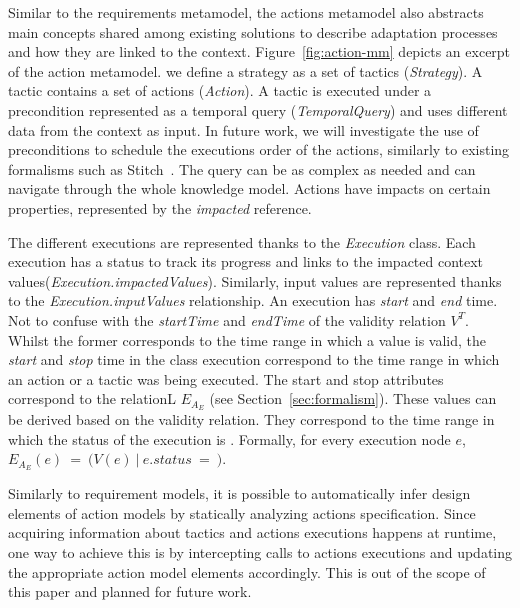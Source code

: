 Similar to the requirements metamodel, the actions metamodel also abstracts main concepts shared among existing solutions to describe adaptation processes and how they are linked to the context. 
Figure~\ref{fig:action-mm} depicts an excerpt of the action metamodel.
we define a strategy as a set of tactics (\textit{Strategy}).
A tactic contains a set of actions (\textit{Action}).
A tactic is executed under a precondition represented as a temporal query (\textit{TemporalQuery}) and uses different data from the context as input.
In future work, we will investigate the use of preconditions to schedule the executions order of the actions, similarly to existing formalisms such as Stitch~\cite{DBLP:journals/jss/ChengG12}.
The query can be as complex as needed and can navigate through the whole knowledge model.
Actions have impacts on certain properties, represented by the \textit{impacted} reference. 

The different executions are represented thanks to the \textit{Execution} class. Each execution has a status to track its progress and links to the impacted context values(\textit{Execution.impactedValues}).
Similarly, input values are represented thanks to the \textit{Execution.inputValues} relationship.
An execution has \textit{start} and \textit{end} time. Not to confuse with the \textit{startTime} and \textit{endTime} of the validity relation $V^T$.
Whilst the former corresponds to the time range in which a value is valid, the \textit{start} and \textit{stop} time in the class execution correspond to the time range in which an action or a tactic was being executed.
The start and stop attributes correspond to the relationL $E_{A_E}$ (see Section~\ref{sec:formalism}). These values can be derived based on the validity relation.
They correspond to the time range in which the status of the execution is .
Formally, for every execution node $e$, $E_{A_E}(e)~=~(V(e)~|~e.status~=~$$)$.


Similarly to requirement models, it is possible to automatically infer design elements of action models by statically analyzing actions specification.
Since acquiring information about tactics and actions executions happens at runtime, one way to achieve this is by intercepting calls to actions executions and updating the appropriate action model elements accordingly.
This is out of the scope of this paper and planned for future work.